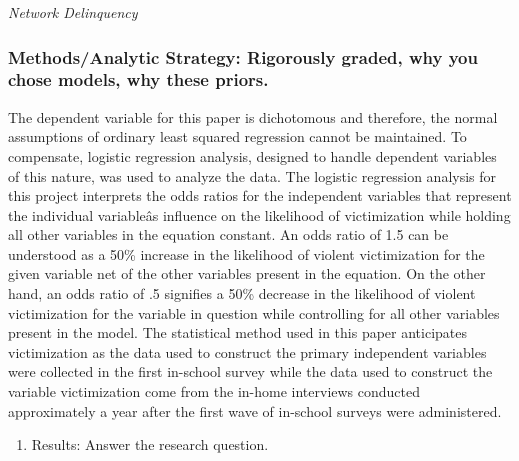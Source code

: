 \documentclass[]{article}
\providecommand{\tightlist}{%
  \setlength{\itemsep}{0pt}\setlength{\parskip}{0pt}}
\begin{document}
\emph{Network Delinquency}

\subsubsection{Methods/Analytic Strategy: Rigorously graded, why you
chose models, why these
priors.}\label{methodsanalytic-strategy-rigorously-graded-why-you-chose-models-why-these-priors.}

The dependent variable for this paper is dichotomous and therefore, the
normal assumptions of ordinary least squared regression cannot be
maintained. To compensate, logistic regression analysis, designed to
handle dependent variables of this nature, was used to analyze the data.
The logistic regression analysis for this project interprets the odds
ratios for the independent variables that represent the individual
variableâs influence on the likelihood of victimization while holding
all other variables in the equation constant. An odds ratio of 1.5 can
be understood as a 50\% increase in the likelihood of violent
victimization for the given variable net of the other variables present
in the equation. On the other hand, an odds ratio of .5 signifies a 50\%
decrease in the likelihood of violent victimization for the variable in
question while controlling for all other variables present in the model.
The statistical method used in this paper anticipates victimization as
the data used to construct the primary independent variables were
collected in the first in-school survey while the data used to construct
the variable victimization come from the in-home interviews conducted
approximately a year after the first wave of in-school surveys were
administered.

\begin{enumerate}
\def\labelenumi{(\arabic{enumi})}
\setcounter{enumi}{5}
\tightlist
\item
  Results: Answer the research question.
\end{enumerate}
\end{document}
